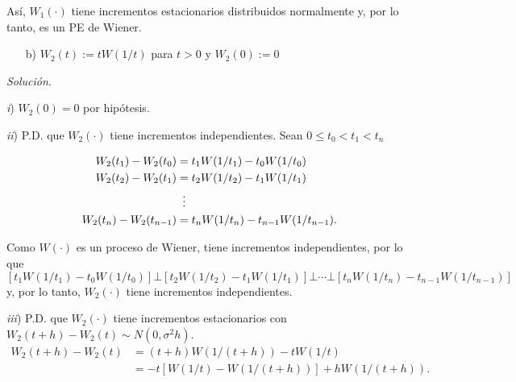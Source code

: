 \documentclass[12pt]{article}
\begin{document}
Así, $W_1(\cdot)$ tiene incrementos estacionarios distribuidos normalmente y, por lo tanto, es un PE de Wiener.

\begin{tcolorbox}[colback=blue!5!white, colframe=blue!5!white, arc=0mm, boxrule=0pt]  
    \begin{itemize}
        \item[b)] $W_2(t) := tW(1/t)$ para $t > 0$ y $W_2(0):=0$
    \end{itemize}
\end{tcolorbox}

\textit{Solución}.

\textit{i}) $W_2(0) = 0$ por hipótesis.

\textit{ii}) P.D. que $W_2(\cdot)$ tiene incrementos independientes. Sean $0 \leq t_0 < t_1 < t_n$

\begin{align*}
    W_2(t_1) - W_2(t_0) &= t_1 W(1/t_1) - t_0W(1/t_0) \\
    W_2(t_2) - W_2(t_1) &= t_2 W(1/t_2) - t_1W(1/t_1) \\
    &\vdotswithin{=} \notag \\
    W_2(t_n) - W_2(t_{n-1}) &= t_n W(1/t_n) - t_{n-1}W(1/t_{n-1}).
\end{align*}

Como $W(\cdot)$ es un proceso de Wiener, tiene incrementos independientes, por lo que 
\[ [t_1 W(1/t_1)- t_0W(1/t_0)] \bot [t_2 W(1/t_2) - t_1W(1/t_1)] \bot \cdots \bot [t_n W(1/t_n) - t_{n-1}W(1/t_{n-1})]  \]
y, por lo tanto, $W_2(\cdot)$ tiene incrementos independientes.

\textit{iii}) P.D. que $W_2(\cdot)$ tiene incrementos estacionarios con $W_2(t+h) - W_2(t) \sim N(0, \sigma^2 h)$.
\begin{align*}
    W_2(t+h)-W_2(t) &= (t+h) W(1/(t+h)) - tW(1/t) \\
    &= -t [ W(1/t) - W(1/(t+h)) ] + hW(1/(t+h)).
\end{align*}
\end{document}
